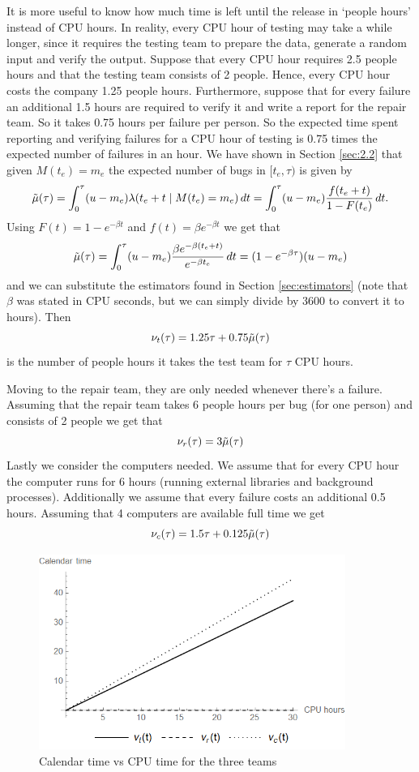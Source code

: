 It is more useful to know how much time is left until the release in `people hours' instead of CPU hours. In reality, every CPU hour of testing may take a while longer, since it requires the testing team to prepare the data, generate a random input and verify the output. Suppose that every CPU hour requires 2.5 people hours and that the testing team consists of 2 people. Hence, every CPU hour costs the company 1.25 people hours. Furthermore, suppose that for every failure an additional 1.5 hours are required to verify it and write a report for the repair team. So it takes 0.75 hours per failure per person. So the expected time spent reporting and verifying failures for a CPU hour of testing is 0.75 times the expected number of failures in an hour. We have shown in Section \ref{sec:2.2} that given $M(t_e)=m_e$ the expected number of bugs in $[t_e,\tau)$ is given by
$$
    \Tilde{\mu}(\tau) = \int_0^{\tau} (u-m_e)\lambda(t_e+t\mid M(t_e)=m_e)\,dt=\int_0^{\tau}(u-m_e)\frac{f(t_e+t)}{1-F(t_e)}\,dt.
$$
Using $F(t)=1-e^{-\beta t}$ and $f(t)=\beta e^{-\beta t}$ we get that
$$
\Tilde{\mu}(\tau) = \int_0^\tau (u-m_e)\frac{\beta e^{-\beta(t_e+t)}}{e^{-\beta t_e}}\,dt=(1-e^{-\beta\tau})(u-m_e)
$$
and we can substitute the estimators found in Section \ref{sec:estimators} (note that $\beta$ was stated in CPU seconds, but we can simply divide by 3600 to convert it to hours). Then
$$
\nu_t(\tau) = 1.25\tau+0.75\Tilde{\mu}(\tau)
$$
is the number of people hours it takes the test team for $\tau$ CPU hours.

Moving to the repair team, they are only needed whenever there's a failure. Assuming that the repair team takes 6 people hours per bug (for one person) and consists of 2 people we get that
$$
\nu_r(\tau)=3\Tilde{\mu}(\tau)
$$
Lastly we consider the computers needed. We assume that for every CPU hour the computer runs for 6 hours (running external libraries and background processes). Additionally we assume that every failure costs an additional 0.5 hours. Assuming that 4 computers are available full time we get
$$
\nu_c(\tau) = 1.5\tau+0.125\Tilde{\mu}(\tau)
$$
\begin{figure}
    \centering
    \includegraphics[width=10cm]{img/plot.png}
    \caption{Calendar time vs CPU time for the three teams}
    \label{fig:plot}
\end{figure}


